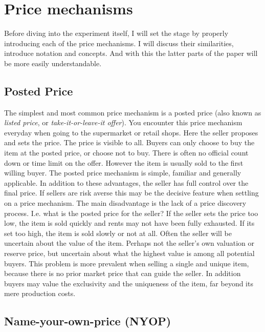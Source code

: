 \documentclass[a4paper,12pt]{article}
\begin{document}
	\section{Price mechanisms}

	Before diving into the experiment itself, I will set the stage by properly introducing each of the price mechanisms. I will discuss their similarities, introduce notation and concepts. And with this the latter parts of the paper will be more easily understandable.

	\subsection{Posted Price}
	The simplest and most common price mechanism is a posted price (also known as {\it listed price}, or {\it take-it-or-leave-it offer}). You encounter this price mechanism everyday when going to the supermarket or retail shops. Here the seller proposes and sets the price. The price is visible to all. Buyers can only choose to buy the item at the posted price, or choose not to buy. There is often no official count down or time limit on the offer. However the item is usually sold to the first willing buyer. The posted price mechanism is simple, familiar and generally applicable. In addition to these advantages, the seller has full control over the final price. If sellers are risk averse this may be the decisive feature when settling on a price mechanism. The main disadvantage is the lack of a price discovery process. I.e. what is the posted price for the seller? If the seller sets the price too low, the item is sold quickly and rents may not have been fully exhausted. If its set too high, the item is sold slowly or not at all. Often the seller will be uncertain about the value of the item. Perhaps not the seller's own valuation or reserve price, but uncertain about what the highest value is among all potential buyers. This problem is more prevalent when selling a single and unique item, because there is no prior market price that can guide the seller. In addition buyers may value the exclusivity and the uniqueness of the item, far beyond its mere production costs.

	\subsection{Name-your-own-price (NYOP)}
\end{document}
